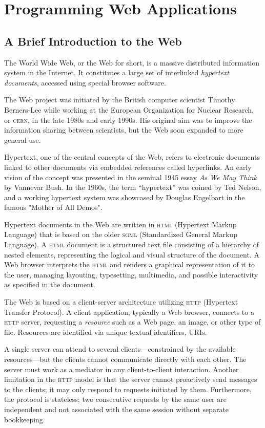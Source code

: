 \chapter{Programming Web Applications}

\section{A Brief Introduction to the Web}

The World Wide Web, or the Web for short, is a massive distributed information system in the Internet. It constitutes a large set of interlinked \emph{hypertext documents}, accessed using special browser software.

The Web project was initiated by the British computer scientist Timothy Berners-Lee while working at the European Organization for Nuclear Research, or \textsc{cern}, in the late 1980s and early 1990s. His original aim was to improve the information sharing between scientists, but the Web soon expanded to more general use.

Hypertext, one of the central concepts of the Web, refers to electronic documents linked to other documents via embedded references called hyperlinks. An early vision of the concept was presented in the seminal 1945 essay \emph{As We May Think} by Vannevar Bush. In the 1960s, the term ``hypertext'' was coined by Ted Nelson, and a working hypertext system was showcased by Douglas Engelbart in the famous "Mother of All Demos".

Hypertext documents in the Web are written in \textsc{html} (Hypertext Markup Language) that is based on the older \textsc{sgml} (Standardized General Markup Language). A \textsc{html} document is a structured text file consisting of a hierarchy of nested elements, representing the logical and visual structure of the document. A Web browser interprets the \textsc{html} and renders a graphical representation of it to the user, managing layouting, typesetting, multimedia, and possible interactivity as specified in the document.

The Web is based on a client-server architecture utilizing \textsc{http} (Hypertext Transfer Protocol). A client application, typically a Web browser, connects to a \textsc{http} server, requesting a \emph{resource} such as a Web page, an image, or other type of file. Resources are identified via unique textual identifiers, \textsc{URI}s.

A single server can attend to several clients---constrained by the available resources---but the clients cannot communicate directly with each other. The server must work as a mediator in any client-to-client interaction. Another limitation in the \textsc{http} model is that the server cannot proactively send messages to the clients; it may only respond to requests initiated by them. Furthermore, the protocol is stateless; two consecutive requests by the same user are independent and not associated with the same session without separate bookkeeping.

